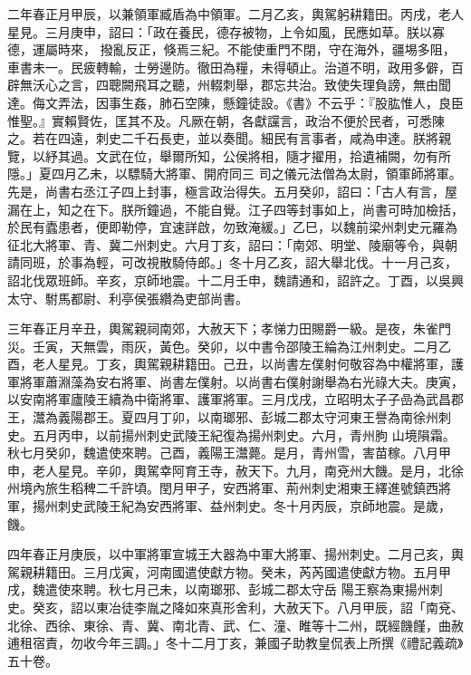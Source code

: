\begin{pinyinscope}
 二年春正月甲辰，以兼領軍臧盾為中領軍。二月乙亥，輿駕躬耕籍田。丙戌，老人星見。三月庚申，詔曰：「政在養民，德存被物，上令如風，民應如草。朕以寡德，運屬時來，
 撥亂反正，倏焉三紀。不能使重門不閉，守在海外，疆埸多阻，車書未一。民疲轉輸，士勞邊防。徹田為糧，未得頓止。治道不明，政用多僻，百辟無沃心之言，四聰闕飛耳之聽，州輟刺舉，郡忘共治。致使失理負謗，無由聞達。侮文弄法，因事生姦，肺石空陳，懸鐘徒設。《書》不云乎：『股肱惟人，良臣惟聖。』實賴賢佐，匡其不及。凡厥在朝，各獻讜言，政治不便於民者，可悉陳之。若在四遠，刺史二千石長吏，並以奏聞。細民有言事者，咸為申達。朕將親覽，以紓其過。文武在位，舉爾所知，公侯將相，隨才擢用，拾遺補闕，勿有所隱。」夏四月乙未，以驃騎大將軍、開府同三
 司之儀元法僧為太尉，領軍師將軍。先是，尚書右丞江子四上封事，極言政治得失。五月癸卯，詔曰：「古人有言，屋漏在上，知之在下。朕所鐘過，不能自覺。江子四等封事如上，尚書可時加檢括，於民有蠹患者，便即勒停，宜速詳啟，勿致淹緩。」乙巳，以魏前梁州刺史元羅為征北大將軍、青、冀二州刺史。六月丁亥，詔曰：「南郊、明堂、陵廟等令，與朝請同班，於事為輕，可改視散騎侍郎。」冬十月乙亥，詔大舉北伐。十一月己亥，詔北伐眾班師。辛亥，京師地震。十二月壬申，魏請通和，詔許之。丁酉，以吳興太守、駙馬都尉、利亭侯張纘為吏部尚書。



 三年春正月辛丑，輿駕親祠南郊，大赦天下；孝悌力田賜爵一級。是夜，朱雀門災。壬寅，天無雲，雨灰，黃色。癸卯，以中書令邵陵王綸為江州刺史。二月乙酉，老人星見。丁亥，輿駕親耕籍田。己丑，以尚書左僕射何敬容為中權將軍，護軍將軍蕭淵藻為安右將軍、尚書左僕射。以尚書右僕射謝舉為右光祿大夫。庚寅，以安南將軍廬陵王續為中衛將軍、護軍將軍。三月戊戌，立昭明太子子嵒為武昌郡王，灊為義陽郡王。夏四月丁卯，以南瑯邪、彭城二郡太守河東王譽為南徐州刺史。五月丙申，以前揚州刺史武陵王紀復為揚州刺史。六月，青州朐
 山境隕霜。秋七月癸卯，魏遣使來聘。己酉，義陽王灊薨。是月，青州雪，害苗稼。八月甲申，老人星見。辛卯，輿駕幸阿育王寺，赦天下。九月，南兗州大饑。是月，北徐州境內旅生稻稗二千許頃。閏月甲子，安西將軍、荊州刺史湘東王繹進號鎮西將軍，揚州刺史武陵王紀為安西將軍、益州刺史。冬十月丙辰，京師地震。是歲，饑。



 四年春正月庚辰，以中軍將軍宣城王大器為中軍大將軍、揚州刺史。二月己亥，輿駕親耕籍田。三月戊寅，河南國遣使獻方物。癸未，芮芮國遣使獻方物。五月甲戌，魏遣使來聘。秋七月己未，以南瑯邪、彭城二郡太守岳
 陽王察為東揚州刺史。癸亥，詔以東冶徒李胤之降如來真形舍利，大赦天下。八月甲辰，詔「南兗、北徐、西徐、東徐、青、冀、南北青、武、仁、潼、睢等十二州，既經饑饉，曲赦逋租宿責，勿收今年三調。」冬十二月丁亥，兼國子助教皇侃表上所撰《禮記義疏》五十卷。




\end{pinyinscope}
